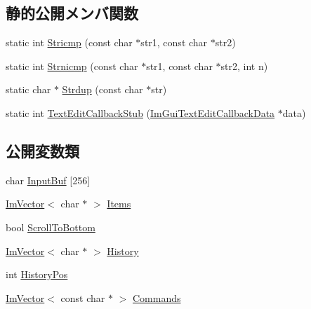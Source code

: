 \subsection*{静的公開メンバ関数}
\begin{DoxyCompactItemize}
\item 
static int \mbox{\hyperlink{struct_example_app_console_a6e5e5d66e77618eff0f89785261c9391}{Stricmp}} (const char $\ast$str1, const char $\ast$str2)
\item 
static int \mbox{\hyperlink{struct_example_app_console_a11bcb7a4b801e5eeb0c098c082fedc25}{Strnicmp}} (const char $\ast$str1, const char $\ast$str2, int n)
\item 
static char $\ast$ \mbox{\hyperlink{struct_example_app_console_a61d0da41ef31ea8690b23681a1e54dba}{Strdup}} (const char $\ast$str)
\item 
static int \mbox{\hyperlink{struct_example_app_console_a722d9b5dc6df127f27c83afeee29bfd3}{Text\+Edit\+Callback\+Stub}} (\mbox{\hyperlink{struct_im_gui_text_edit_callback_data}{Im\+Gui\+Text\+Edit\+Callback\+Data}} $\ast$data)
\end{DoxyCompactItemize}
\subsection*{公開変数類}
\begin{DoxyCompactItemize}
\item 
char \mbox{\hyperlink{struct_example_app_console_ab30accde81ae6833bd2ecf35f43f01ab}{Input\+Buf}} \mbox{[}256\mbox{]}
\item 
\mbox{\hyperlink{class_im_vector}{Im\+Vector}}$<$ char $\ast$ $>$ \mbox{\hyperlink{struct_example_app_console_acfde7d45fb733ac72d5d500168557b36}{Items}}
\item 
bool \mbox{\hyperlink{struct_example_app_console_a69b1406795fd71a3757761b0767ea1c5}{Scroll\+To\+Bottom}}
\item 
\mbox{\hyperlink{class_im_vector}{Im\+Vector}}$<$ char $\ast$ $>$ \mbox{\hyperlink{struct_example_app_console_a11c7fa54e744288f3606e4d6521d6345}{History}}
\item 
int \mbox{\hyperlink{struct_example_app_console_a2508db0a7d205947cea65b141d4ed589}{History\+Pos}}
\item 
\mbox{\hyperlink{class_im_vector}{Im\+Vector}}$<$ const char $\ast$ $>$ \mbox{\hyperlink{struct_example_app_console_a1eebee69cceb0345cf9d9b6e6beb9d03}{Commands}}
\end{DoxyCompactItemize}


